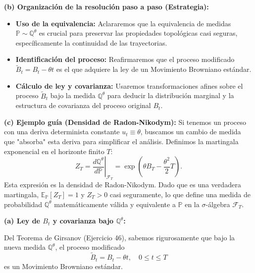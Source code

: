 \documentclass[11pt, letterpaper]{article}
\begin{document}
\begin{solucion}
    \textbf{(b) Organización de la resolución paso a paso (Estrategia):}
    \begin{itemize}
        \item[(i)] \textbf{Uso de la equivalencia:} Aclararemos que la equivalencia de medidas $\mathbb{P} \sim \mathbb{Q}^\theta$ es crucial para preservar las propiedades topológicas casi seguras, específicamente la continuidad de las trayectorias.
        \item[(ii)] \textbf{Identificación del proceso:} Reafirmaremos que el proceso modificado $\tilde{B}_t = B_t - \theta t$ es el que adquiere la ley de un Movimiento Browniano estándar.
        \item[(iii)] \textbf{Cálculo de ley y covarianza:} Usaremos transformaciones afines sobre el proceso $\tilde{B}_t$ bajo la medida $\mathbb{Q}^\theta$ para deducir la distribución marginal y la estructura de covarianza del proceso original $B_t$.
    \end{itemize}

    \vspace{3mm}
    \textbf{(c) Ejemplo guía (Densidad de Radon-Nikodym):}
    Si tenemos un proceso con una deriva determinista constante $u_t \equiv \theta$, buscamos un cambio de medida que "absorba" esta deriva para simplificar el análisis. Definimos la martingala exponencial en el horizonte finito $T$:
    \[ Z_T = \left.\frac{d\mathbb{Q}^\theta}{d\mathbb{P}}\right|_{\mathcal{F}_T} = \exp\left( \theta B_T - \frac{\theta^2}{2} T \right). \]
    Esta expresión es la densidad de Radon-Nikodym. Dado que es una verdadera martingala, $\mathbb{E}_{\mathbb{P}}[Z_T] = 1$ y $Z_T > 0$ casi seguramente, lo que define una medida de probabilidad $\mathbb{Q}^\theta$ matemáticamente válida y equivalente a $\mathbb{P}$ en la $\sigma$-álgebra $\mathcal{F}_T$.

    \vspace{3mm}
    \textbf{(a) Ley de $B_t$ y covarianza bajo $\mathbb{Q}^\theta$:}

    Del Teorema de Girsanov (Ejercicio 46), sabemos rigurosamente que bajo la nueva medida $\mathbb{Q}^\theta$, el proceso modificado
    \[ \tilde{B}_t = B_t - \theta t, \quad 0 \le t \le T \]
    es un Movimiento Browniano estándar.


\end{solucion}
\end{document}
